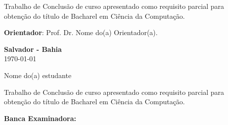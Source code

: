 \documentclass[12pt, a4paper]{report}
\begin{document}
\vspace{4cm}

\begin{flushright}
\begin{minipage}{8.6cm}
Trabalho de Conclusão de curso apresentado como 
requisito parcial para obtenção 
do título de Bacharel em Ciência da Computação.

\vspace{0.5cm}
\textbf{Orientador}: Prof. Dr. Nome do(a) Orientador(a).

\end{minipage}
\end{flushright}

\vspace{8cm}


\begin{center}
\textbf{Salvador - Bahia} \\
\today
\end{center}


\newpage
\begin{center}

\vspace{2.2cm}

\large{Nome do(a) estudante}
\end{center}

\vspace{2.2cm}

\begin{flushright}
\begin{minipage}{8.6cm} 
Trabalho de Conclusão de curso apresentado como 
requisito parcial para obtenção 
do título de Bacharel em Ciência da Computação.
\end{minipage}
\end{flushright}

\vspace{1cm}
\begin{center}
\Large \textbf{Banca Examinadora:}
\end{center}
\vspace{1.5cm}
\end{document}
